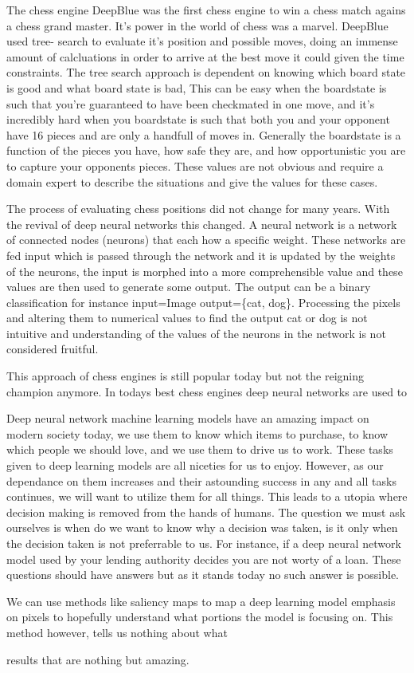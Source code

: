 The chess engine DeepBlue was the first chess engine to win a chess match agains a
chess grand master. It's power in the world of chess was a marvel. DeepBlue used tree-
search to evaluate it's position and possible moves, doing an immense amount of calcluations
in order to arrive at the best move it could given the time constraints. The tree search
approach is dependent on knowing which board state is good and what board state is bad,
This can be easy when the boardstate is such that you're guaranteed to have been checkmated
in one move, and it's incredibly hard when you boardstate is such that both you and your
opponent have 16 pieces and are only a handfull of moves in. Generally the boardstate
is a function of the pieces you have, how safe they are, and how opportunistic you are to
capture your opponents pieces. These values are not obvious and require a domain expert
to describe the situations and give the values for these cases.

The process of evaluating chess positions did not change for many years. With the revival
of deep neural networks this changed. A neural network is a network of connected nodes (neurons)
that each how a specific weight. These networks are fed input which is passed through the
network and it is updated by the weights of the neurons, the input is morphed into
a more comprehensible value and these values are then used to generate some output.
The output can be a binary classification for instance input=Image output=\{cat, dog\}.
Processing the pixels and altering them to numerical values to find the output cat or dog
is not intuitive and understanding of the values of the neurons in the network
is not considered fruitful.



This approach of
chess engines is still popular today but not the reigning champion anymore. In todays
best chess engines deep neural networks are used to

Deep neural network machine learning models have an amazing impact on modern society today,
we use them to know which items to purchase, to know which people we should love, and we
use them to drive us to work. These tasks given to deep learning models are all niceties
for us to enjoy. However, as our dependance on them increases and their astounding success
in any and all tasks continues, we will want to utilize them for all things. This leads
to a utopia where decision making is removed from the hands of humans. The question we
must ask ourselves is when do we want to know why a decision was taken, is it only when
the decision taken is not preferrable to us. For instance, if a deep neural network model
used by your lending authority decides you are not worty of a loan. These questions should
have answers but as it stands today no such answer is possible.

We can use methods like saliency maps to map a deep learning model emphasis on pixels to
hopefully understand what portions the model is focusing on. This method however, tells us
nothing about what

results that are nothing but amazing.
